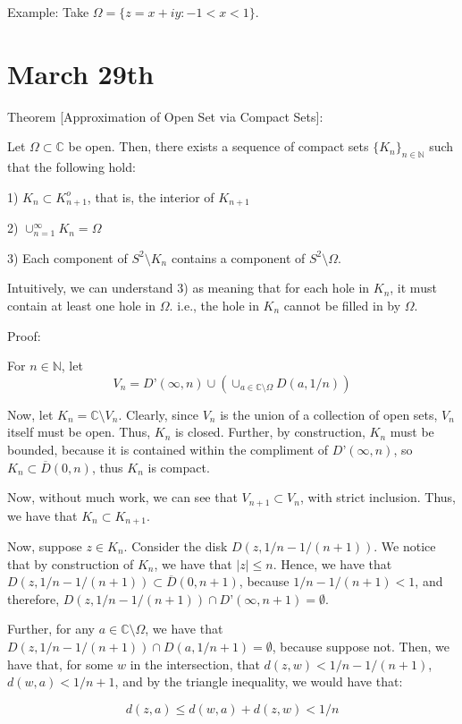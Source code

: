 \documentclass[10pt]{article}
\begin{document}
Example: Take $\Omega = \{ z = x + iy : -1 < x < 1 \}$.

\section*{March 29th}

Theorem [Approximation of Open Set via Compact Sets]:

Let $\Omega \subset \mathbb{C}$ be open. Then, there exists a sequence of compact sets $\{ K_n \}_{n \in \mathbb{N}}$ such that the following hold:

1) $K_n \subset K_{n+1}^o$, that is, the interior of $K_{n+1}$

2) $\cup_{n=1}^\infty K_n = \Omega$

3) Each component of $S^2 \setminus K_n$ contains a component of $S^2 \setminus \Omega$. 

Intuitively, we can understand 3) as meaning that for each hole in $K_n$, it must contain at least one hole in $\Omega$. i.e., the hole in $K_n$ cannot be filled in by $\Omega$. 

Proof:

For $n \in \mathbb{N}$, let $$V_n = D’(\infty, n) \cup \left( \cup_{a \in \mathbb{C} \setminus \Omega} D(a,1/n) \right) $$

Now, let $K_n = \mathbb{C} \setminus V_n$. Clearly, since $V_n$ is the union of a collection of open sets, $V_n$ itself must be open. Thus, $K_n$ is closed. Further, by construction, $K_n$ must be bounded, because it is contained within the compliment of $D’(\infty, n)$, so $K_n \subset \overline{D}(0,n)$, thus $K_n$ is compact. 

Now, without much work, we can see that $V_{n+1} \subset V_n$, with strict inclusion. Thus, we have that $K_n \subset K_{n+1}$. 

Now, suppose $z \in K_n$. Consider the disk $D(z, 1/n - 1/(n+1))$. We notice that by construction of $K_n$, we have that $|z| \leq n$. Hence, we have that $D(z, 1/n - 1/(n+1)) \subset \overline{D}(0,n+1)$, because $1/n - 1/(n+1) < 1$, and therefore, $D(z, 1/n - 1/(n+1)) \cap D’(\infty, n+1) = \emptyset$.

Further, for any $a \in \mathbb{C} \setminus \Omega$, we have that $D(z, 1/n - 1/(n+1)) \cap D(a, 1/n+1) = \emptyset$, because suppose not. Then, we have that, for some $w$ in the intersection, that $d(z,w) < 1/n - 1/(n+1)$, $d(w,a) < 1/n+1$, and by the triangle inequality, we would have that:

$$ d(z,a) \leq d(w,a) + d(z,w) < 1/n $$
\end{document}
